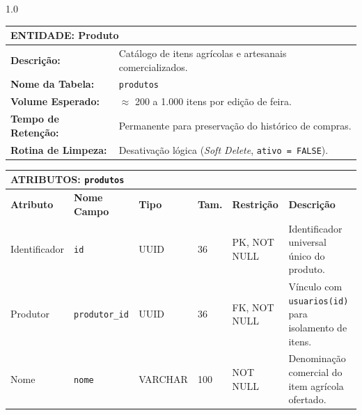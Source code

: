 \documentclass[12pt,a4paper]{article}
\begin{document}
\begin{spacing}{1.0}

\small

\noindent

\begin{tabularx}{\textwidth}{|p{3.0cm}|X|}

\hline

\multicolumn{2}{|l|}{\textbf{ENTIDADE: Produto}} \\ \hline

\textbf{Descrição:} & Catálogo de itens agrícolas e artesanais comercializados. \\ \hline

\textbf{Nome da Tabela:} & \texttt{produtos} \\ \hline

\textbf{Volume Esperado:} & $\approx$ 200 a 1.000 itens por edição de feira. \\ \hline

\textbf{Tempo de Retenção:} & Permanente para preservação do histórico de compras. \\ \hline

\textbf{Rotina de Limpeza:} & Desativação lógica (\textit{Soft Delete}, \texttt{ativo = FALSE}). \\ \hline

\end{tabularx}

\vspace{0.25cm}

\noindent

\begin{tabularx}{\textwidth}{|p{1.6cm}|p{1.9cm}|p{1.2cm}|p{0.7cm}|p{1.9cm}|X|}

\hline

\multicolumn{6}{|l|}{\textbf{ATRIBUTOS: \texttt{produtos}}} \\ \hline

\textbf{Atributo} & \textbf{Nome Campo} & \textbf{Tipo} & \textbf{Tam.} & \textbf{Restrição} & \textbf{Descrição} \\ \hline

Identificador & \texttt{id} & UUID & 36 & PK, NOT NULL & Identificador universal único do produto. \\ \hline

Produtor & \texttt{produtor\_id} & UUID & 36 & FK, NOT NULL & Vínculo com \texttt{usuarios(id)} para isolamento de itens. \\ \hline

Nome & \texttt{nome} & VARCHAR & 100 & NOT NULL & Denominação comercial do item agrícola ofertado. \\ \hline


\end{tabularx}
\end{spacing}
\end{document}
